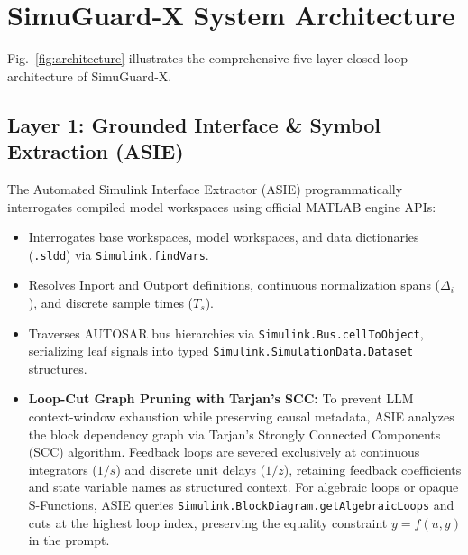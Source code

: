\documentclass[journal]{IEEEtran}
\begin{document}
\section{SimuGuard-X System Architecture}
Fig.~\ref{fig:architecture} illustrates the comprehensive five-layer closed-loop architecture of SimuGuard-X.

\subsection{Layer 1: Grounded Interface \& Symbol Extraction (ASIE)}
The Automated Simulink Interface Extractor (ASIE) programmatically interrogates compiled model workspaces using official MATLAB engine APIs:
\begin{itemize}
    \item Interrogates base workspaces, model workspaces, and data dictionaries (\texttt{.sldd}) via \texttt{Simulink.findVars}.
    \item Resolves Inport and Outport definitions, continuous normalization spans ($\Delta_i$), and discrete sample times ($T_s$).
    \item Traverses AUTOSAR bus hierarchies via \texttt{Simulink.Bus.cellToObject}, serializing leaf signals into typed \texttt{Simulink.SimulationData.Dataset} structures.
    \item \textbf{Loop-Cut Graph Pruning with Tarjan's SCC:} To prevent LLM context-window exhaustion while preserving causal metadata, ASIE analyzes the block dependency graph via Tarjan's Strongly Connected Components (SCC) algorithm. Feedback loops are severed exclusively at continuous integrators ($1/s$) and discrete unit delays ($1/z$), retaining feedback coefficients and state variable names as structured context. For algebraic loops or opaque S-Functions, ASIE queries \texttt{Simulink.BlockDiagram.getAlgebraicLoops} and cuts at the highest loop index, preserving the equality constraint $y = f(u, y)$ in the prompt.
\end{itemize}
\end{document}
